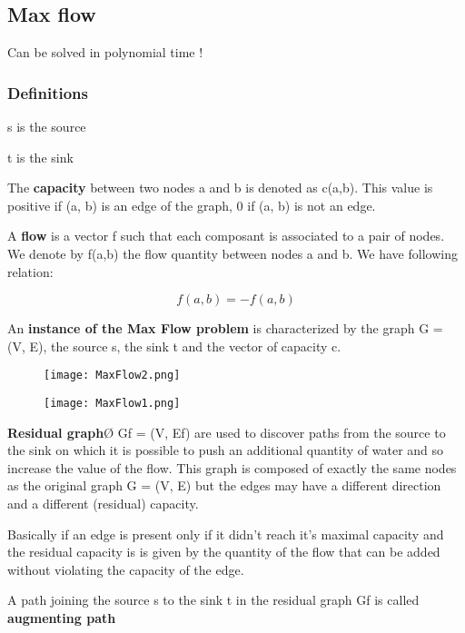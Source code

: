 \subsection{Max flow}

Can be solved in polynomial time !

\subsubsection{Definitions}

s is the source \newline

t is the sink \newline

The \textbf{capacity} between two nodes a and b is denoted as c(a,b).
This value is positive if (a, b) is an edge of the graph, 0 if (a, b) is
not an edge.\newline

A \textbf{flow} is a vector f such that each composant is associated to a
pair of nodes. We denote by f(a,b) the flow quantity between
nodes a and b. We have following relation:

$$f(a,b) = -f(a,b)$$ 

An \textbf{instance of the Max Flow problem} is characterized by the
graph G = (V, E), the source s, the sink t and the vector of
capacity c.

\begin{figure}[!ht]
    \centering
    \texttt{[image: MaxFlow2.png]}
\end{figure}
\FloatBarrier

\begin{figure}[!ht]
    \centering
    \texttt{[image: MaxFlow1.png]}
\end{figure}
\FloatBarrier

\textbf{Residual graph}Ø Gf = (V, Ef) are used to discover paths from the
source to the sink on which it is possible to push an
additional quantity of water and so increase the value of the
flow. This graph is composed of exactly the same nodes as the
original graph G = (V, E) but the edges may have a different
direction and a different (residual) capacity.

Basically if an edge is present only if it didn't reach it's maximal capacity and 
the residual capacity is is given by the quantity of the flow that can be added 
without violating the capacity of the edge.

A path joining the source s to the sink t in the residual graph Gf is
called \textbf{augmenting path}

